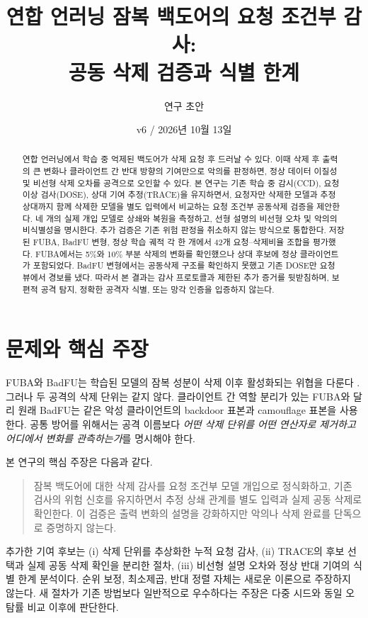 \documentclass[10pt,a4paper]{article}
\title{연합 언러닝 잠복 백도어의 요청 조건부 감사:\\공동 삭제 검증과 식별 한계}
\author{연구 초안}
\date{v6 / 2026년 10월 13일}
\begin{document}
\maketitle

\begin{abstract}
연합 언러닝에서 학습 중 억제된 백도어가 삭제 요청 후 드러날 수 있다.
이때 삭제 후 출력의 큰 변화나 클라이언트 간 반대 방향의 기여만으로 악의를 판정하면,
정상 데이터 이질성 및 비선형 삭제 오차를 공격으로 오인할 수 있다.
본 연구는 기존 학습 중 감시(CCD), 요청 이상 검사(DOSE), 상대 기여 추정(TRACE)을 유지하면서,
요청자만 삭제한 모델과 추정 상대까지 함께 삭제한 모델을 별도 입력에서 비교하는
요청 조건부 공동삭제 검증을 제안한다. 네 개의 실제 개입 모델로 상쇄와 복원을 측정하고,
선형 설명의 비선형 오차 및 악의의 비식별성을 명시한다.
추가 검증은 기존 위험 판정을 취소하지 않는 방식으로 통합한다.
저장된 FUBA, BadFU 변형, 정상 학습 궤적 각 한 개에서 42개 요청--삭제비율 조합을 평가했다.
FUBA에서는 5\%와 10\% 부분 삭제의 변화를 확인했으나 상대 후보에 정상 클라이언트가 포함되었다.
BadFU 변형에서는 공동삭제 구조를 확인하지 못했고 기존 DOSE만 요청 뷰에서 경보를 냈다.
따라서 본 결과는 감사 프로토콜과 제한된 추가 증거를 뒷받침하며,
보편적 공격 탐지, 정확한 공격자 식별, 또는 망각 인증을 입증하지 않는다.
\end{abstract}

\section{문제와 핵심 주장}
FUBA와 BadFU는 학습된 모델의 잠복 성분이 삭제 이후 활성화되는 위협을 다룬다
\cite{fuba,badfu}. 그러나 두 공격의 삭제 단위는 같지 않다.
클라이언트 간 역할 분리가 있는 FUBA와 달리 원래 BadFU는 같은 악성 클라이언트의
backdoor 표본과 camouflage 표본을 사용한다. 공통 방어를 위해서는 공격 이름보다
\emph{어떤 삭제 단위를 어떤 연산자로 제거하고 어디에서 변화를 관측하는가}를 명시해야 한다.

본 연구의 핵심 주장은 다음과 같다.
\begin{quote}
잠복 백도어에 대한 삭제 감사를 요청 조건부 모델 개입으로 정식화하고,
기존 검사의 위험 신호를 유지하면서 추정 상쇄 관계를 별도 입력과 실제 공동 삭제로 확인한다.
이 검증은 출력 변화의 설명을 강화하지만 악의나 삭제 완료를 단독으로 증명하지 않는다.
\end{quote}

추가한 기여 후보는 (i) 삭제 단위를 추상화한 누적 요청 감사,
(ii) TRACE의 후보 선택과 실제 공동 삭제 확인을 분리한 절차,
(iii) 비선형 설명 오차와 정상 반대 기여의 식별 한계 분석이다.
순위 보정, 최소제곱, 반대 정렬 자체는 새로운 이론으로 주장하지 않는다.
새 절차가 기존 방법보다 일반적으로 우수하다는 주장은 다중 시드와 동일 오탐률 비교 이후에 판단한다.
\end{document}
